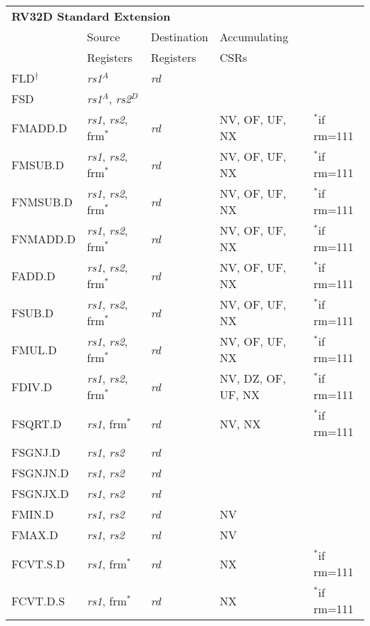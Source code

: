 \begin{tabular}{p{3cm}|p{25mm}|p{3cm}|p{4cm}|p{4cm}}
  \multicolumn{4}{l}{\bf RV32D Standard Extension} \\
  \cline{2-4}
   & Source    & Destination & Accumulating \\
   & Registers & Registers   & CSRs \\
  \cline{2-4}
   FLD$^\dagger$ & {\em rs1}$^A$ & {\em rd} &   & \\
   \cline{2-4}
   FSD & {\em rs1}$^A$, {\em rs2}$^D$ &  &   & \\
   \cline{2-4}
   FMADD.D & {\em rs1}, {\em rs2}, frm$^*$ & {\em rd} & NV, OF, UF, NX & $^*$if rm=111  \\
   \cline{2-4}
   FMSUB.D & {\em rs1}, {\em rs2}, frm$^*$ & {\em rd} & NV, OF, UF, NX & $^*$if rm=111  \\
   \cline{2-4}
   FNMSUB.D & {\em rs1}, {\em rs2}, frm$^*$ & {\em rd} & NV, OF, UF, NX & $^*$if rm=111  \\
   \cline{2-4}
   FNMADD.D & {\em rs1}, {\em rs2}, frm$^*$ & {\em rd} & NV, OF, UF, NX & $^*$if rm=111  \\
   \cline{2-4}
   FADD.D & {\em rs1}, {\em rs2}, frm$^*$ & {\em rd} & NV, OF, UF, NX & $^*$if rm=111  \\
   \cline{2-4}
   FSUB.D & {\em rs1}, {\em rs2}, frm$^*$ & {\em rd} & NV, OF, UF, NX & $^*$if rm=111  \\
   \cline{2-4}
   FMUL.D & {\em rs1}, {\em rs2}, frm$^*$ & {\em rd} & NV, OF, UF, NX & $^*$if rm=111  \\
   \cline{2-4}
   FDIV.D & {\em rs1}, {\em rs2}, frm$^*$ & {\em rd} & NV, DZ, OF, UF, NX & $^*$if rm=111  \\
   \cline{2-4}
   FSQRT.D & {\em rs1}, frm$^*$ & {\em rd} & NV, NX & $^*$if rm=111  \\
   \cline{2-4}
   FSGNJ.D & {\em rs1}, {\em rs2} & {\em rd} &   & \\
   \cline{2-4}
   FSGNJN.D & {\em rs1}, {\em rs2} & {\em rd} &   & \\
   \cline{2-4}
   FSGNJX.D & {\em rs1}, {\em rs2} & {\em rd} &   & \\
   \cline{2-4}
   FMIN.D & {\em rs1}, {\em rs2} & {\em rd} & NV &   \\
   \cline{2-4}
   FMAX.D & {\em rs1}, {\em rs2} & {\em rd} & NV &   \\
   \cline{2-4}
   FCVT.S.D & {\em rs1}, frm$^*$ & {\em rd} & NX & $^*$if rm=111  \\
   \cline{2-4}
   FCVT.D.S & {\em rs1}, frm$^*$ & {\em rd} & NX & $^*$if rm=111  \\

\end{tabular}
